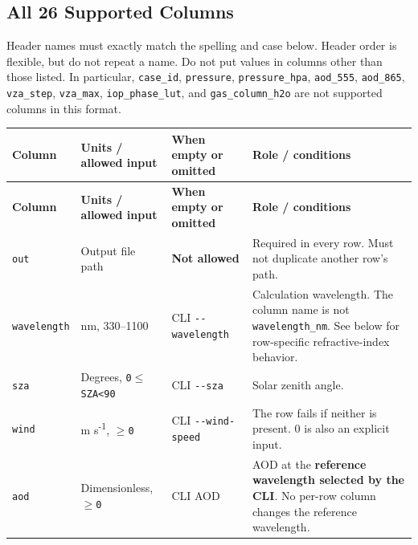 \subsection{All 26 Supported Columns}
\label{sec:auto:08_input_formats:2.2}
Header names must exactly match the spelling and case below. Header order is flexible, but do not repeat a name. Do not put values in columns other than those listed. In particular, \texttt{case\_\allowbreak{}id}, \texttt{pressure}, \texttt{pressure\_\allowbreak{}hpa}, \texttt{aod\_\allowbreak{}555}, \texttt{aod\_\allowbreak{}865}, \texttt{vza\_\allowbreak{}step}, \texttt{vza\_\allowbreak{}max}, \texttt{iop\_\allowbreak{}phase\_\allowbreak{}lut}, and \texttt{gas\_\allowbreak{}column\_\allowbreak{}h2o} are not supported columns in this format.


{\TableFont
\begin{longtable}{@{}>{\raggedright\arraybackslash}p{}>{\raggedright\arraybackslash}p{}>{\raggedright\arraybackslash}p{}>{\raggedright\arraybackslash}p{}@{}}
\toprule
\textbf{Column} & \textbf{Units / allowed input} & \textbf{When empty or omitted} & \textbf{Role / conditions} \\
\midrule
\endfirsthead
\toprule
\textbf{Column} & \textbf{Units / allowed input} & \textbf{When empty or omitted} & \textbf{Role / conditions} \\
\midrule
\endhead
\bottomrule
\endfoot
\texttt{out} & Output file path & \textbf{Not allowed} & Required in every row. Must not duplicate another row's path. \\
\texttt{wavelength} & nm, 330--1100 & CLI \texttt{-\allowbreak{}-\allowbreak{}wavelength} & Calculation wavelength. The column name is not \texttt{wavelength\_\allowbreak{}nm}. See below for row-specific refractive-index behavior. \\
\texttt{sza} & Degrees, \texttt{0\ensuremath{\leq}SZA<90} & CLI \texttt{-\allowbreak{}-\allowbreak{}sza} & Solar zenith angle. \\
\texttt{wind} & m s\textsuperscript{-}\textsuperscript{1}, \texttt{\ensuremath{\geq}0} & CLI \texttt{-\allowbreak{}-\allowbreak{}wind-\allowbreak{}speed} & The row fails if neither is present. 0 is also an explicit input. \\
\texttt{aod} & Dimensionless, \texttt{\ensuremath{\geq}0} & CLI AOD & AOD at the \textbf{reference wavelength selected by the CLI}. No per-row column changes the reference wavelength. \\

\end{longtable}}
